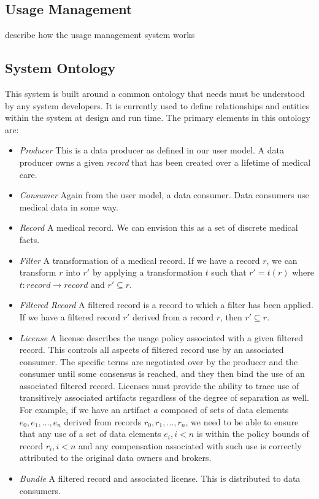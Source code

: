 \documentclass[10pt, conference, compsocconf]{IEEEtran}
\begin{document}
\subsection*{Usage Management}
describe how the usage management system works

\subsection*{System Ontology}
This system is built around a common ontology that needs must be understood by any system developers.  It is currently used to define relationships and entities within the system at design and run time.  The primary elements in this ontology are:
\begin{itemize}
\item \textit{Producer} This is a data producer as defined in our user model.  A data producer owns a given \textit{record} that has been created over a lifetime of medical care.
\item \textit{Consumer} Again from the user model, a data consumer.  Data consumers use medical data in some way.
\item \textit{Record} A medical record.  We can envision this as a set of discrete medical facts.
\item \textit{Filter} A transformation of a medical record.  If we have a record $ r $, we can transform $ r $ into $ r' $ by applying a transformation $ t $ such that $ r' = t(r) $ where $ t : record \rightarrow record $ and $ r' \subseteq r $.
\item \textit{Filtered Record} A filtered record is a record to which a filter has been applied.  If we have a filtered record $ r' $ derived from a record $ r $, then $ r' \subseteq r $.
\item \textit{License} A license describes the usage policy associated with a given filtered record.  This controls all aspects of filtered record use by an associated consumer.  The specific terms are negotiated over by the producer and the consumer until some consensus is reached, and they then bind the use of an associated filtered record.  Licenses must provide the ability to trace use of transitively associated artifacts regardless of the degree of separation as well.  For example, if we have an artifact $ a $ composed of sets of data elements $ e_{0}, e_{1}, ... , e_{n} $ derived from records $ r_{0}, r_{1}, ... , r_{n} $, we need to be able to ensure that any use of a set of data elements $ e_{i}, i < n $ is within the policy bounds of record $ r_{i}, i < n $ and any compensation associated with such use is correctly attributed to the original data owners and brokers.
\item \textit{Bundle} A filtered record and associated license.  This is distributed to data consumers.
\end{itemize}
\end{document}
